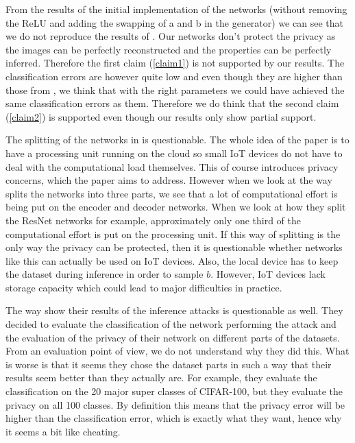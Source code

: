 From the results of the initial implementation of the networks (without removing the ReLU and adding the swapping of a and b in the generator) we can see that we do not reproduce the results of \cite{xiang2020interpretable}. Our networks don't protect the privacy as the images can be perfectly reconstructed and the properties can be perfectly inferred. Therefore the first claim (\ref{claim1}) is not supported by our results. The classification errors are however quite low and even though they are higher than those from \cite{xiang2020interpretable}, we think that with the right parameters we could have achieved the same classification errors as them. Therefore we do think that the second claim (\ref{claim2}) is supported even though our results only show partial support.

The splitting of the networks in \cite{xiang2020interpretable} is questionable. The whole idea of the paper is to have a processing unit running on the cloud so small IoT devices do not have to deal with the computational load themselves. This of course introduces privacy concerns, which the paper aims to address. However when we look at the way \cite{xiang2020interpretable} splits the networks into three parts, we see that a lot of computational effort is being put on the encoder and decoder networks. When we look at how they split the ResNet networks for example, approximately only one third of the computational effort is put on the processing unit. If this way of splitting is the only way the privacy can be protected, then it is questionable whether networks like this can actually be used on IoT devices. Also, the local device has to keep the dataset during inference in order to sample $b$. However, IoT devices lack storage capacity which could lead to major difficulties in practice.

The way \cite{xiang2020interpretable} show their results of the inference attacks is questionable as well. They decided to evaluate the classification of the network performing the attack and the evaluation of the privacy of their network on different parts of the datasets. From an evaluation point of view, we do not understand why they did this. What is worse is that it seems they chose the dataset parts in such a way that their results seem better than they actually are. For example, they evaluate the classification on the 20 major super classes of CIFAR-100, but they evaluate the privacy on all 100 classes. By definition this means that the privacy error will be higher than the classification error, which is exactly what they want, hence why it seems a bit like cheating.

